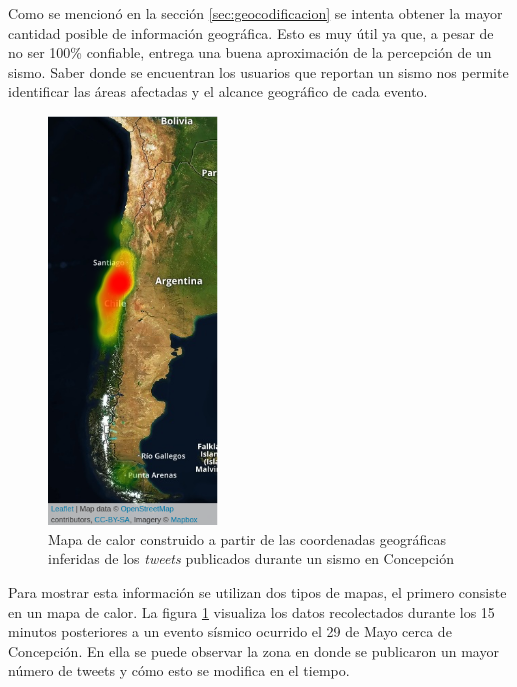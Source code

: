	  	
	Como se mencionó en la sección \ref{sec:geocodificacion} se intenta obtener la mayor cantidad posible de información geográfica. 
	Esto es muy útil ya que, a pesar de no ser 100\% confiable, entrega una buena aproximación de la percepción de un sismo. 
	Saber donde se encuentran los usuarios que reportan un sismo nos permite identificar las áreas afectadas y el alcance geográfico de cada evento. 
	
	\begin{figure}
	\vspace{-20px}
	  \centering
	  \includegraphics[trim={0 0 0 0}, clip, width=0.4\textwidth]{imagenes/heatmap.png}
	  \caption{Mapa de calor construido a partir de las coordenadas geográficas inferidas de los \textit{tweets} publicados durante un sismo en Concepción}
	\label{fig:heatmap}
	\vspace{-130px}
	\end{figure} 
	
	Para mostrar esta información se utilizan dos tipos de mapas, el primero consiste en un mapa de calor. 
	La figura \ref{fig:heatmap} visualiza los datos recolectados durante los 15 minutos posteriores a un evento sísmico ocurrido el 29 de Mayo cerca de Concepción. 
	En ella se puede observar la zona en donde se publicaron un mayor número de tweets y cómo esto se modifica en el tiempo.
	
